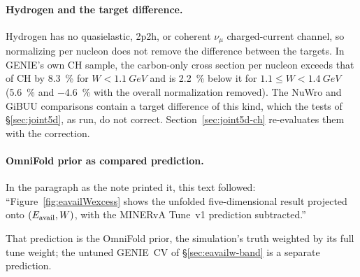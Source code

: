 \paragraph{Hydrogen and the target difference.} Hydrogen has no quasielastic, 2p2h, or coherent $\nu_{\mu}$ charged-current channel, so normalizing per nucleon does not remove the difference between the targets.  In GENIE's own CH sample, the carbon-only cross section per nucleon exceeds that of CH by \SI{8.3}{\percent} for $W<\SI{1.1}{GeV}$ and is \SI{2.2}{\percent} below it for $1.1\le W<\SI{1.4}{GeV}$ (\SI{+5.6}{\percent} and \SI{-4.6}{\percent} with the overall normalization removed).  The NuWro and GiBUU comparisons contain a target difference of this kind, which the tests of \S\ref{sec:joint5d}, as run, do not correct. Section~\ref{sec:joint5d-ch} re-evaluates them with the correction.

\paragraph{OmniFold prior as compared prediction.} In the paragraph as the note printed it, this text followed: ``Figure~\ref{fig:eavailWexcess} shows the unfolded five-dimensional result projected onto $(E_{\mathrm{avail}},W)$, with the MINERvA Tune~v1 prediction subtracted.''\par That prediction is the OmniFold prior, the simulation's truth weighted by its full tune weight; the untuned GENIE~CV of \S\ref{sec:eavailw-band} is a separate prediction.

